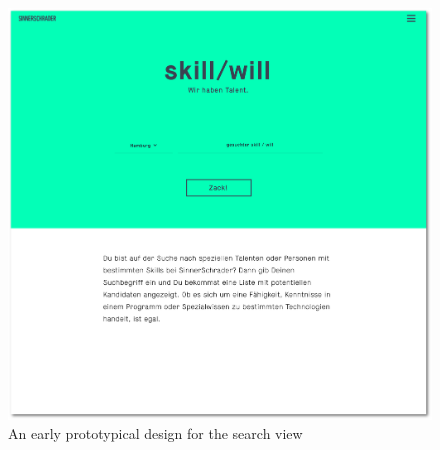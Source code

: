 \begin{figure}[p]
    \centering
    \includegraphics[width=\textwidth]{images/design_home.png}
    \caption[Illustration: Search Page (Concept)]{An early prototypical design for the search view}
    \label{fig:design_home}
\end{figure}

\newpage

